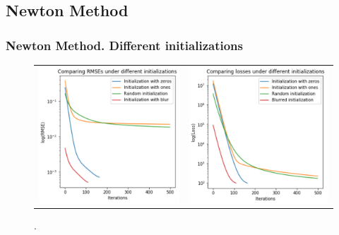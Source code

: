\documentclass[hyperref={pdfpagelabels=false}]{beamer}
\begin{document}
\subsection{Newton Method}
\begin{frame}
\frametitle{Newton Method. Different initializations}

\begin{center}
\begin{figure}[h]
\begin{adjustwidth}{-0.9cm}{-0.9 cm}
\begin{tabular}{cc}
\includegraphics[scale=0.435]{new_rmse.png} &
\includegraphics[scale=0.435]{new_loss.png} 
\end{tabular}
\end{adjustwidth}
\caption{.}
\end{figure}
\end{center}
\end{frame}
\end{document}

